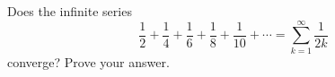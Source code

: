 Does the infinite series
\[\dfrac12+\dfrac14+\dfrac16+\dfrac18+\dfrac1{10}+\cdots=\sum_{k=1}^{\infty}\dfrac{1}{2k}\]
converge? Prove your answer.
